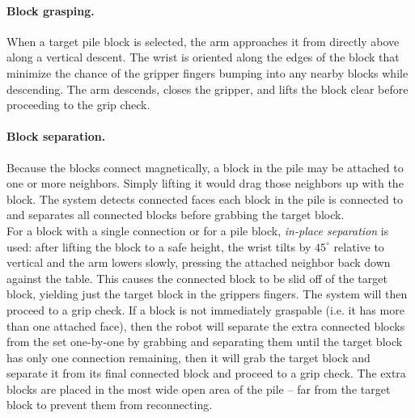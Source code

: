 \paragraph{Block grasping.}
When a target pile block is selected, the arm approaches it from directly above
along a vertical descent. The wrist is oriented along the edges of the block that minimize the chance of the gripper fingers bumping into any nearby blocks while descending. The arm descends, closes
the gripper, and lifts the block clear before proceeding to the grip check.

\paragraph{Block separation.}
Because the blocks connect magnetically, a block in the pile may be attached to
one or more neighbors. Simply lifting it would drag those neighbors up with the block. The system detects connected faces each block in the pile is connected to and separates all connected blocks before grabbing the target block.\\

\noindent For a block with a single connection or for a pile block, \emph{in-place
separation} is used: after lifting the block to a safe height, the wrist tilts
by $45^\circ$ relative to vertical and the arm lowers slowly, pressing the
attached neighbor back down against the table. This causes the connected block to be slid off of the target block, yielding just the target block in the grippers fingers. The system will then proceed to a grip check. If a block is not immediately graspable (i.e. it has more than one attached face), then the robot will separate the extra connected blocks from the set one-by-one by grabbing and separating them until the target block has only one connection remaining, then it will grab the target block and separate it from its final connected block and proceed to a grip check. The extra blocks are placed in the most wide open area of the pile -- far from the target block to prevent them from reconnecting.


